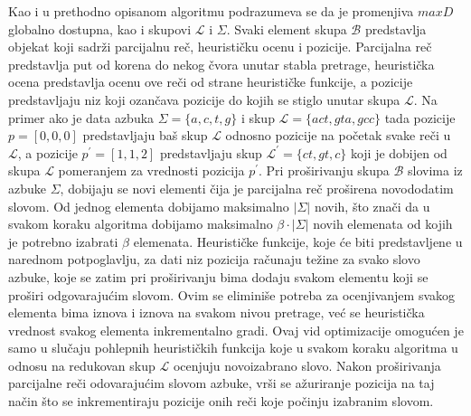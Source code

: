 \documentclass[12pt,oneside]{memoir}
\begin{document}
Kao i u prethodno opisanom algoritmu podrazumeva se da je promenjiva $maxD$ globalno dostupna,
kao i skupovi $\mathcal{L}$ i $\Sigma$. Svaki element skupa $\mathcal{B}$ predstavlja objekat koji
sadrži parcijalnu reč, heurističku ocenu i pozicije.
Parcijalna reč predstavlja put od korena do nekog čvora unutar stabla pretrage, 
heuristička ocena predstavlja ocenu ove reči od strane heurističke funkcije, a pozicije predstavljaju
niz koji ozančava pozicije do kojih se stiglo unutar skupa $\mathcal{L}$.
Na primer ako je data azbuka $\Sigma=\{a, c, t, g\}$ i skup $\mathcal{L}=\{act,gta,gcc\}$ tada
pozicije $p=[0,0,0]$ predstavljaju baš skup $\mathcal{L}$ odnosno
pozicije na početak svake reči u $\mathcal{L}$, a pozicije $p^{'}=[1,1,2]$ predstavljaju
skup $\mathcal{L}^{'}=\{ct,gt,c\}$ koji je dobijen od skupa $\mathcal{L}$ pomeranjem
za vrednosti pozicija $p^{'}$.  
Pri proširivanju skupa $\mathcal{B}$ slovima iz azbuke $\Sigma$, dobijaju se novi
elementi čija je parcijalna reč proširena novododatim slovom. Od jednog elementa
dobijamo maksimalno $|\Sigma|$ novih, što znači da u svakom koraku algoritma dobijamo
maksimalno $\beta \cdot |\Sigma|$ novih elemenata od kojih je potrebno izabrati $\beta$ 
elemenata. 
Heurističke funkcije, koje će biti predstavljene u narednom potpoglavlju,
za dati niz pozicija računaju težine za svako slovo azbuke, koje se zatim pri proširivanju bima
dodaju svakom elementu koji se proširi odgovarajućim slovom. Ovim se eliminiše potreba za ocenjivanjem
svakog elementa bima iznova i iznova na svakom nivou pretrage, već se heuristička vrednost svakog elementa
inkrementalno gradi. Ovaj vid optimizacije omogućen je samo u slučaju pohlepnih heurističkih funkcija
koje u svakom koraku algoritma u odnosu na redukovan skup $\mathcal{L}$ ocenjuju
novoizabrano slovo.
Nakon proširivanja parcijalne reči odovarajućim slovom azbuke,
vrši se ažuriranje pozicija na taj način što se inkrementiraju pozicije 
onih reči koje počinju izabranim slovom.
\end{document}
